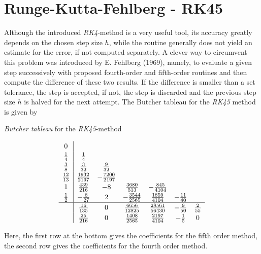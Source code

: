 \documentclass[./main.tex]{subfiles}
\begin{document}
\section{Runge-Kutta-Fehlberg - RK45}
Although the introduced \textit{RK4}-method is a very useful tool, its accuracy greatly depends on the chosen step size $h$, while the routine generally does not yield an estimate for the error, if not computed separately. A clever way to circumvent this problem was introduced by E. Fehlberg (1969), namely, to evaluate a given step successively with proposed fourth-order and fifth-order routines and then compute the difference of these two results. If the difference is smaller than a set tolerance, the step is accepted, if not, the step is discarded and the previous step size $h$ is halved for the next attempt.
The Butcher tableau for the \textit{RK45} method is given by \\

\begin{table}[h]
\caption{\textit{Butcher tableau} for the \textit{RK45}-method}
\label{tab:Butcher_RK45}
\[
\renewcommand\arraystretch{1.2}
\begin{array}
{c|ccccccc}
0\\
\frac{1}{4} & \frac{1}{4}\\
\frac{3}{8} & \frac{3}{32} &\frac{9}{32} \\
\frac{12}{13}& \frac{1932}{2197}& -\frac{7200}{2197}\\
1& \frac{439}{216}&-8&\frac{3680}{513}&-\frac{845}{4104} \\
\frac{1}{2}&-\frac{8}{27}&2&-\frac{3544}{2565}&\frac{1859}{4104}&-\frac{11}{40}\\
\hline
& \frac{16}{135}&0&\frac{6656}{12825}&\frac{28561}{56430}&-\frac{9}{50}&\frac{2}{55}\\
&\frac{25}{216}&0&\frac{1408}{2565}&\frac{2197}{4104}&-\frac{1}{5}&0\\
\end{array}
\]
\end{table}
Here, the first row at the bottom gives the coefficients for the fifth order method, the second row gives the coefficients for the fourth order method.
\end{document}
